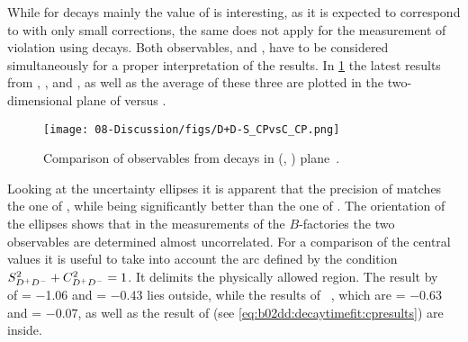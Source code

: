 While for \BdToJPsiKS decays mainly the value of \SJpsiKS is interesting, as
it is expected to correspond to \sintwobeta with only small corrections, the
same does not apply for the measurement of \CP violation using \BdToDD decays.
Both observables, \SDD and \CDD, have to be considered simultaneously for a
proper interpretation of the results. In \cref{fig:discussion:b2ddcomparison}
the latest results from \babar, \belle, and \lhcb, as well as the average of
these three are plotted in the two-dimensional plane of \CDD versus \SDD.
\begin{figure}[htb]
\centering
\texttt{[image: 08-Discussion/figs/D+D-S\_CPvsC\_CP.png]}
\caption{Comparison of \CP observables from \mbox{\BdToDD} decays in (\SDD,
\CDD) plane~\cite{HFAG}.}
\label{fig:discussion:b2ddcomparison}
\end{figure}
Looking at the uncertainty ellipses it is apparent that the precision of \lhcb
matches the one of \belle, while being significantly better than the one of
\babar. The orientation of the ellipses shows that in the measurements of the
$B$-factories the two \CP observables are determined almost uncorrelated. For
a comparison of the central values it is useful to take into account the arc
defined by the condition $S_{{{D}^+}{{D}^-}}^2+C_{{{D}^+}{{D}^-}}^2=1$. It delimits the physically allowed
region. The result by \belle~\cite{Rohrken:2012ta} of \SDD = \num{-1.06} and
\CDD = \num{-0.43} lies outside, while the results of
\babar~\cite{Aubert:2008ah}, which are \SDD = \num{-0.63} and \CDD =
\num{-0.07}, as well as the result of \lhcb (see
\cref{eq:b02dd:decaytimefit:cpresults}) are inside.
